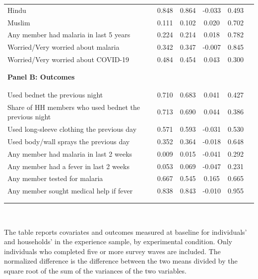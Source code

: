 {\begin{tabular}{lccccc}
Hindu & 0.848 & 0.864 & -0.033 & 0.493 & \\
Muslim & 0.111 & 0.102 & 0.020 & 0.702 & \\
Any member had malaria in last 5 years & 0.224 & 0.214 & 0.018 & 0.782 & \\
Worried/Very worried about malaria & 0.342 & 0.347 & -0.007 & 0.845 & \\
Worried/Very worried about COVID-19 & 0.484 & 0.454 & 0.043 & 0.300 & \\
\hline \hline \\[-5.5ex] &  &  &  &  & \\
\textbf{Panel B: Outcomes} &  &  &  &  & \\
 &  &  &  &  & \\[-5ex]\\
Used bednet the previous night & 0.710 & 0.683 & 0.041 & 0.427 & \\
Share of HH members who used bednet the previous night & 0.713 & 0.690 & 0.044 & 0.386 & \\
Used long-sleeve clothing the previous day & 0.571 & 0.593 & -0.031 & 0.530 & \\
Used body/wall sprays the previous day & 0.352 & 0.364 & -0.018 & 0.648 & \\
Any member had malaria in last 2 weeks & 0.009 & 0.015 & -0.041 & 0.292 & \\
Any member had a fever in last 2 weeks & 0.053 & 0.069 & -0.047 & 0.231 & \\
Any member tested for malaria & 0.667 & 0.545 & 0.165 & 0.665 & \\
Any member sought medical help if fever & 0.838 & 0.843 & -0.010 & 0.955 & \\
\hline \\[-5.1ex] &  &  &  &  & \\
\hline\end{tabular}
}%
\\
\begin{minipage}{1\linewidth}
  \scriptsize  The table reports covariates and outcomes measured at baseline for individuals' and households' in the experience sample, by experimental condition. Only individuals who completed five or more survey waves are included. The normalized difference is the difference between the two means divided by the square root of the sum of the variances of the two variables.\\
\end{minipage}

